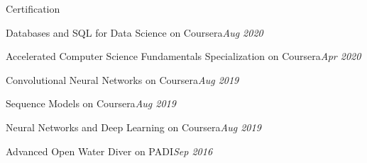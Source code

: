 \documentclass{resume} %
\begin{document}
\begin{rSection}{Certification}
 \item Databases and SQL for Data Science on Coursera\hfill {\em Aug 2020}
\item Accelerated Computer Science Fundamentals Specialization on Coursera\hfill {\em Apr 2020}
\item Convolutional Neural Networks on Coursera\hfill {\em Aug 2019}
\item Sequence Models on Coursera\hfill {\em Aug 2019}
\item Neural Networks and Deep Learning on Coursera\hfill{\em Aug 2019}
\item Advanced Open Water Diver on PADI\hfill{\em Sep 2016}
\end{rSection}
\end{document}
